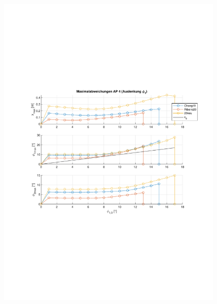 \begin{figure}
\begin{minipage}[t]{0.45\linewidth}
		\includegraphics[scale=0.47]{Bilder/Parameter neu (Ribeiro) Creg off/AP41.pdf}
		\label{fig:ap3}
	 \end{minipage}
	\quad
	\begin{minipage}[t]{0.45\linewidth}
		\centering

\end{minipage}
\end{figure}
